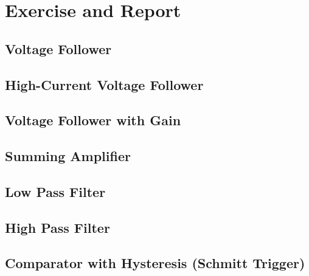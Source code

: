 \section{Exercise and Report}
\subsection{Voltage Follower}
\subsection{High-Current Voltage Follower}
\subsection{Voltage Follower with Gain}
\subsection{Summing Amplifier}
\subsection{Low Pass Filter}
\subsection{High Pass Filter}
\subsection{Comparator with Hysteresis (Schmitt Trigger)}